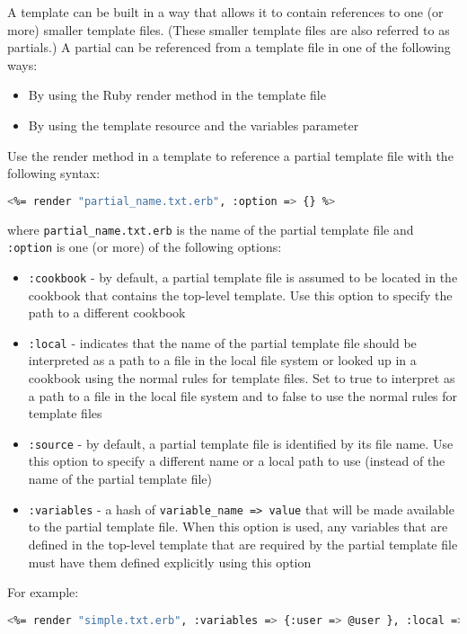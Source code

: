 A template can be built in a way that allows it to contain references to one (or more) smaller template files. (These smaller template files are also referred to as partials.) A partial can be referenced from a template file in one of the following ways:

\begin{itemize}
  \item By using the Ruby render method in the template file
  \item By using the template resource and the variables parameter
\end{itemize}

Use the render method in a template to reference a partial template file with the following syntax:

\begin{lstlisting}[language=Bash,label=lst:cookbook-templates10]
<%= render "partial_name.txt.erb", :option => {} %>
\end{lstlisting}

where \lstinline!partial_name.txt.erb! is the name of the partial template file and \lstinline!:option! is one (or more) of the following options:

\begin{itemize}
  \item \lstinline!:cookbook! - by default, a partial template file is assumed to be located in the cookbook that contains the top-level template. Use this option to specify the path to a different cookbook
  \item \lstinline!:local! - indicates that the name of the partial template file should be interpreted as a path to a file in the local file system or looked up in a cookbook using the normal rules for template files. Set to true to interpret as a path to a file in the local file system and to false to use the normal rules for template files
  \item \lstinline!:source! - by default, a partial template file is identified by its file name. Use this option to specify a different name or a local path to use (instead of the name of the partial template file)
  \item \lstinline!:variables! - a hash of \lstinline!variable_name => value! that will be made available to the partial template file. When this option is used, any variables that are defined in the top-level template that are required by the partial template file must have them defined explicitly using this option
\end{itemize}

For example:

\begin{lstlisting}[language=Bash,label=lst:cookbook-templates11]
<%= render "simple.txt.erb", :variables => {:user => @user }, :local => true %>
\end{lstlisting}

